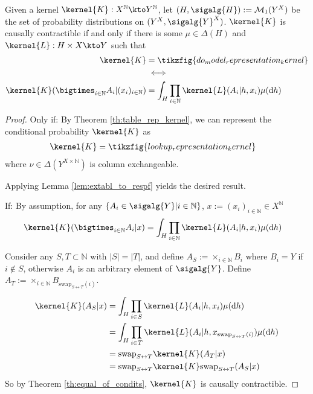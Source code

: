\begin{theorem}\label{th:ciid_rep_kernel}
Given a kernel $\kernel{K}:X^{\mathbb{N}}\kto Y^{\mathbb{N}}$, let $(H,\sigalg{H}):=\mathcal{M}_1(Y^X)$ be the set of probability distributions on $(Y^X,\sigalg{Y}^X)$. $\kernel{K}$ is causally contractible if and only if there is some $\mu\in \Delta(H)$ and $\kernel{L}:H\times X\kto Y$ such that
\begin{align}
    \kernel{K} &= \tikzfig{do_model_representation_kernel}\\
    &\iff\\
    \kernel{K}(\bigtimes_{i\in\mathbb{N}}A_i|(x_i)_{i\in\mathbb{N}}) &= \int_H \prod_{i\in\mathbb{N}} \kernel{L}(A_i|h,x_i)\mu(\mathrm{d}h)
\end{align}
\end{theorem}

\begin{proof}
Only if:
By Theorem \ref{th:table_rep_kernel}, we can represent the conditional probability $\kernel{K}$ as
\begin{align}
        \kernel{K} &= \tikzfig{lookup_representation_kernel}\label{eq:lookup_representation}
\end{align}
where $\nu\in \Delta(Y^{X\times\mathbb{N}})$ is column exchangeable.

Applying Lemma \ref{lem:extabl_to_respf} yields the desired result.

If:
By assumption, for any $\{A_i\in \sigalg{Y}|i\in\mathbb{N}\}$, $x:=(x_i)_{i\in\mathbb{N}}\in X^{\mathbb{N}}$
\begin{align}
    \kernel{K}(\bigtimes_{i\in \mathbb{N}} A_i|x) &= \int_H \prod_{i\in \mathbb{N}}\kernel{L}(A_i|h,x_i)\mu(\mathrm{d}h)
\end{align}

Consider any $S,T\subset\mathbb{N}$ with $|S|=|T|$, and define $A_S:=\times_{i\in\mathbb{N}} B_i$ where $B_i=Y$ if $i\not\in S$, otherwise $A_i$ is an arbitrary element of $\sigalg{Y}$. Define $A_T:=\times_{i\in\mathbb{N}} B_{\mathrm{swap}_{S\leftrightarrow T}(i)}$.

\begin{align}
    \kernel{K}(A_S|x) &= \int_H \prod_{i\in S}\kernel{L}(A_i|h,x_i)\mu(\mathrm{d}h)\\
                      &= \int_H\prod_{i\in T}\kernel{L}(A_i|h,x_{\mathrm{swap}_{S\leftrightarrow T}(i)})\mu(\mathrm{d}h)\\
                      &= \mathrm{swap}_{S\leftrightarrow T}\kernel{K}(A_T|x)\\
                      &= \mathrm{swap}_{S\leftrightarrow T}\kernel{K}\mathrm{swap}_{S\leftrightarrow T}(A_S|x)
\end{align}
So by Theorem \ref{th:equal_of_condits}, $\kernel{K}$ is causally contractible.
\end{proof}

